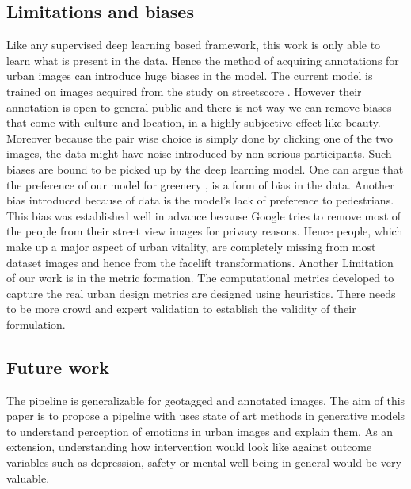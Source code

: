 \subsection{Limitations and biases}
Like any supervised deep learning based framework, this work is only able to learn what is present in the data. Hence the method of acquiring annotations  for urban images can introduce huge biases in the model. The current model is trained on images acquired from the study on streetscore \cite{naik2014streetscore}. However their annotation is open to general public and there is not way we can remove biases that come with culture and location, in a highly subjective effect like beauty. Moreover because the pair wise choice is simply done by clicking one of the two images, the data might have noise introduced by non-serious participants. Such biases are bound to be picked up by the deep learning model. One can argue that the preference of our model for greenery , is a form of bias in the data. Another bias introduced because of data is the model's lack of preference to pedestrians. This bias was established well in advance because Google tries to remove most of the people from their street view images for privacy reasons. Hence people, which make up a major aspect of urban vitality, are completely missing from most dataset images and hence from the facelift transformations. 
Another Limitation of our work is in the metric formation. The computational metrics developed to capture the real urban design metrics are designed using heuristics. There needs to be more crowd and expert validation to establish the validity of their formulation. 

\subsection{Future work}
The pipeline is generalizable for geotagged and annotated images. The aim of this paper is to propose a pipeline with uses state of art methods in generative models to understand perception of emotions in urban images and explain them. As an extension, understanding how intervention would look like against outcome variables such as depression, safety or mental well-being in general would be very valuable.